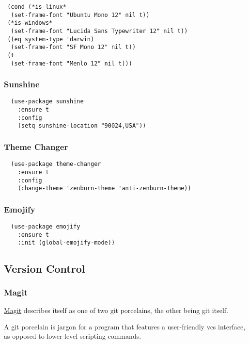 \documentclass[11pt]{article}
\begin{document}
\begin{verbatim}
 (cond (*is-linux*
  (set-frame-font "Ubuntu Mono 12" nil t))
 (*is-windows*
  (set-frame-font "Lucida Sans Typewriter 12" nil t))
 ((eq system-type 'darwin)
  (set-frame-font "SF Mono 12" nil t))
 (t
  (set-frame-font "Menlo 12" nil t)))
\end{verbatim}

\subsubsection*{Sunshine}
\label{sec:org395bcc1}

\begin{verbatim}
  (use-package sunshine
    :ensure t
    :config
    (setq sunshine-location "90024,USA"))
\end{verbatim}

\subsubsection*{Theme Changer}
\label{sec:org76a1bc7}

\begin{verbatim}
  (use-package theme-changer
    :ensure t
    :config
    (change-theme 'zenburn-theme 'anti-zenburn-theme))
\end{verbatim}

\subsubsection*{Emojify}
\label{sec:orgc8d3e70}

\begin{verbatim}
  (use-package emojify
    :ensure t
    :init (global-emojify-mode))
\end{verbatim}

\subsection*{Version Control}
\label{sec:org05a5b3b}
\subsubsection*{Magit}
\label{sec:org07e2eee}

\href{https://github.com/magit/magit}{Magit} describes itself as one of two git porcelains, the other being
git itself.

A git porcelain is jargon for a program that features a user-friendly
vcs interface, as opposed to lower-level scripting commands.
\end{document}
